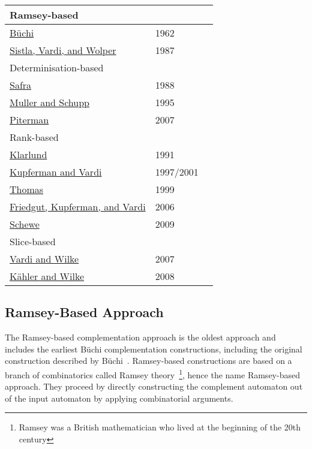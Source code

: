 \newcommand{\ii}{\hspace{5mm}}
\newcommand{\vstrut}{\vphantom{$2^{2^2}$}}
\begin{longtable}[l]{lll}
\multicolumn{3}{l}{Ramsey-based} \\
\hline
\ii\hyperref[2_buchi62]{Büchi} & 1962 & \cite{buchi1960decision} \\
\ii\hyperref[2_svw87]  {Sistla, Vardi, and Wolper} & 1987 & \cite{1985_sistla,PrasadSistla1987217} \\
\multicolumn{3}{l}{Determinisation-based\vstrut} \\
\hline
\ii\hyperref[2_safra88]{Safra} & 1988 & \cite{1988_safra_2,1988_safra_1} \\
\ii\hyperref[2_ms95]{Muller and Schupp} & 1995 & \cite{Muller199569} \\
\ii\hyperref[2_pit07]{Piterman} & 2007 & \cite{2006_piterman,2007_piterman} \\
\multicolumn{3}{l}{Rank-based\vstrut} \\
\hline
\ii\hyperref[2_kla91]{Klarlund} & 1991 & \cite{1991_klarlund} \\
\ii\hyperref[2_kv01]{Kupferman and Vardi} & 1997/2001 & \cite{1997_vardi,Kupferman:2001} \\
\ii\hyperref[2_th99]{Thomas} & 1999 & \cite{1999_thomas} \\
\ii\hyperref[2_fkv06]{Friedgut, Kupferman, and Vardi} & 2006 & \cite{2004_friedgut,friedgut2006buchi} \\
\ii\hyperref[2_schewe09]{Schewe} & 2009 & \cite{schewe2009buchi} \\
\multicolumn{3}{l}{Slice-based\vstrut} \\
\hline
\ii\hyperref[2_vw07]{Vardi and Wilke} & 2007 & \cite{vardi2007automata} \\
\ii\hyperref[2_kw08]{Kähler and Wilke} & 2008 & \cite{2008_kaehler} \\
\end{longtable}


\subsection{Ramsey-Based Approach}
\label{2_ramsey-based}
The Ramsey-based complementation approach is the oldest approach and includes the earliest Büchi complementation constructions, including the original construction described by Büchi~\cite{buchi1960decision}. Ramsey-based constructions are based on a branch of combinatorics called Ramsey theory~\cite{graham1990ramsey}\footnote{Ramsey was a British mathematician who lived at the beginning of the 20th century}, hence the name Ramsey-based approach. They proceed by directly constructing the complement automaton out of the input automaton by applying combinatorial arguments.

